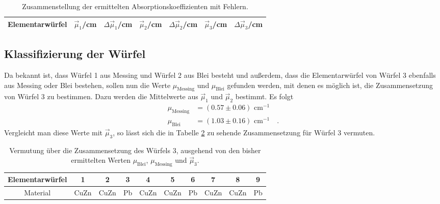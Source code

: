 \begin{table}
\centering
\begin{tabular}{c|cc|cc|cc}
\toprule \midrule
Elementarwürfel & $\vec{\mu}_1$/cm & $\Delta \vec{\mu}_1$/cm& $\vec{\mu}_2$/cm & $\Delta \vec{\mu}_2$/cm& $\vec{\mu}_3$/cm & $\Delta \vec{\mu}_3$/cm \\
\midrule

\midrule
\bottomrule
\end{tabular}
\caption{Zusammenstellung der ermittelten Absorptionskoeffizienten mit Fehlern.}
\label{Ergebnis}
\end{table}
\clearpage
\subsection{Klassifizierung der Würfel}
Da bekannt ist, dass Würfel 1 aus Messing und Würfel 2 aus Blei besteht und außerdem, dass
die Elementarwürfel von Würfel 3 ebenfalls aus Messing oder Blei bestehen, sollen nun
die Werte $\mu_\text{Messing}$ und $\mu_\text{Blei}$ gefunden werden, mit denen es möglich ist,
die Zusammensetzung von Würfel 3 zu bestimmen.
Dazu werden die Mittelwerte aus $\vec{\mu}_1$ und $\vec{\mu}_2$ bestimmt. Es folgt
\begin{align}
\mu_\text{Messing}&=(0.57 \pm 0.06) \text{ cm}^{-1}\\
\mu_\text{Blei}&=(1.03 \pm 0.16) \text{ cm}^{-1} \quad .
\end{align}
Vergleicht man diese Werte mit $\vec{\mu}_3$, so lässt sich die in Tabelle \ref{Zusammensetzung}
zu sehende Zusammensetzung für Würfel 3 vermuten.
\begin{table}[h]
\centering
\begin{tabular}{cccccccccc}
\toprule \midrule
Elementarwürfel 	& 1&2&3&4&5&6&7&8&9 \\
\midrule
	Material&CuZn &CuZn &Pb	&CuZn &CuZn &Pb &CuZn &CuZn & Pb\\
\midrule
\bottomrule
\end{tabular}
\caption{Vermutung über die Zusammensetzung des Würfels 3, ausgehend von den bisher ermittelten
Werten $\mu_\text{Blei}$, $\mu_\text{Messing}$ und $\vec{\mu}_3$.}
\label{Zusammensetzung}
\end{table}
\clearpage
